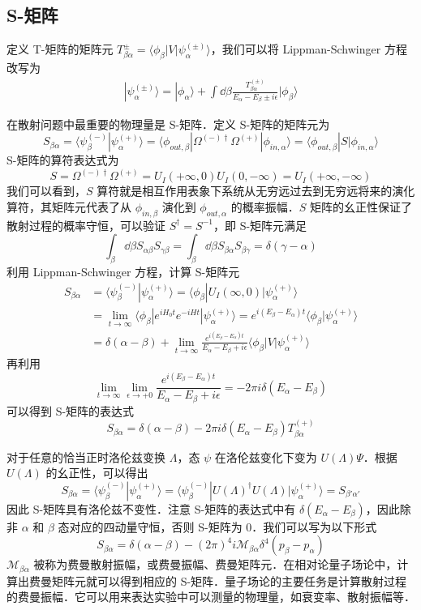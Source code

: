 \subsection{S-矩阵}
定义 T-矩阵的矩阵元 $T_{\beta\alpha}^{\pm}=\langle \phi_\beta|V|\psi_\alpha^{(\pm)}\rangle$，我们可以将 Lippman-Schwinger 方程改写为
\begin{equation}
\begin{aligned}
|\psi_\alpha^{(\pm)}\rangle= |\phi_{\alpha}\rangle+\int \dd\beta \frac{T_{\beta\alpha}^{(\pm)}}{E_\alpha-E_\beta\pm i\epsilon}|\phi_{\beta}\rangle
\end{aligned}
\end{equation}

在散射问题中最重要的物理量是 S-矩阵．定义 S-矩阵的矩阵元为
\[
S_{\beta\alpha}=\langle \psi_{\beta}^{(-)}| \psi_{\alpha}^{(+)}\rangle=\langle \phi_{out,\beta}| \Omega^{(-)\dagger}\Omega^{(+)}|\phi_{in,\alpha}\rangle=\langle \phi_{out,\beta}| S |\phi_{in,\alpha}\rangle
\]
S-矩阵的算符表达式为
\[
S=\Omega^{(-)\dagger}\Omega^{(+)}=U_I(+\infty,0)U_I(0,-\infty)=U_I(+\infty,-\infty)
\]
我们可以看到，$S$ 算符就是相互作用表象下系统从无穷远过去到无穷远将来的演化算符，其矩阵元代表了从 $\phi_{in,\beta}$ 演化到 $\phi_{out,\alpha}$ 的概率振幅．$S$ 矩阵的幺正性保证了散射过程的概率守恒，可以验证 $S^\dagger=S^{-1}$，即 S-矩阵元满足
\[
\int_{\beta}\dd \beta S_{\alpha\beta}S_{\gamma\beta}=\int_{\beta}\dd \beta S_{\beta\alpha}S_{\beta\gamma}=\delta(\gamma-\alpha)
\]
利用 Lippman-Schwinger 方程，计算 S-矩阵元
\begin{align*}
S_{\beta\alpha}&=\langle \psi_{\beta}^{(-)}| \psi_{\alpha}^{(+)}\rangle = \langle \phi_\beta|U_I(\infty,0)|\psi_{\alpha}^{(+)}\rangle\\
&=\lim\limits_{t\rightarrow \infty} \langle \phi_\beta|e^{iH_0 t}e^{-iHt}|\psi_{\alpha}^{(+)}\rangle=e^{i(E_\beta-E_\alpha)t}\langle \phi_\beta|\psi_{\alpha}^{(+)}\rangle\\
&=\delta(\alpha-\beta) + \lim\limits_{t\rightarrow \infty} \frac{e^{i(E_\beta-E_\alpha)t}}{E_\alpha-E_\beta+i\epsilon} \langle \phi_\beta|V|\psi_\alpha^{(+)}\rangle
\end{align*}
再利用
\[
\lim\limits_{t\rightarrow \infty}\lim\limits_{\epsilon\rightarrow +0} \frac{e^{i(E_\beta-E_\alpha)t}}{E_\alpha-E_\beta+i\epsilon}=-2\pi i \delta(E_\alpha-E_\beta)
\]
可以得到 S-矩阵的表达式
\[
S_{\beta\alpha}=\delta(\alpha-\beta)-2\pi i \delta(E_\alpha-E_\beta)T_{\beta\alpha}^{(+)}
\]

对于任意的恰当正时洛伦兹变换 $\Lambda$，态 $\psi$ 在洛伦兹变化下变为 $U(\Lambda)\Psi$．根据 $U(\Lambda)$ 的幺正性，可以得出
\[
S_{\beta\alpha}=\langle \psi_\beta^{(-)}| \psi_\alpha^{(+)} \rangle=\langle \psi_\beta^{(-)}| U(\Lambda)^\dagger U(\Lambda) |\psi_\alpha^{(+)} \rangle=S_{\beta'\alpha'}
\]
因此 S-矩阵具有洛伦兹不变性．注意 S-矩阵的表达式中有 $\delta(E_\alpha-E_\beta)$，因此除非 $\alpha$ 和 $\beta$ 态对应的四动量守恒，否则 S-矩阵为 $0$．我们可以写为以下形式
\[
S_{\beta\alpha}=\delta(\alpha-\beta)-(2\pi)^4 i \mathcal{M}_{\beta\alpha}\delta^4(p_\beta-p_\alpha)
\]
$\mathcal{M}_{\beta\alpha}$ 被称为费曼散射振幅，或费曼振幅、费曼矩阵元．在相对论量子场论中，计算出费曼矩阵元就可以得到相应的 S-矩阵．量子场论的主要任务是计算散射过程的费曼振幅．它可以用来表达实验中可以测量的物理量，如衰变率、散射振幅等．
